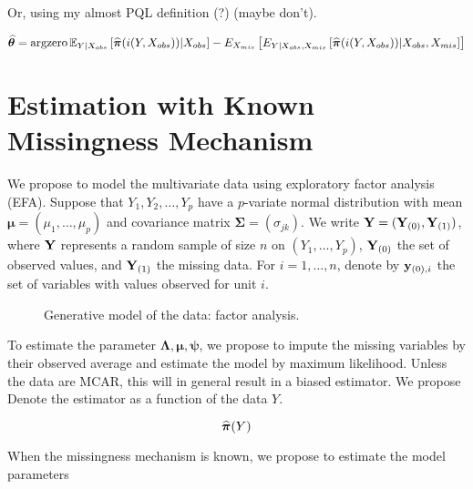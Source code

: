 \documentclass{article}
\begin{document}
Or, using my almost PQL definition (?) (maybe don't).

$$
\widehat{{\bm{\theta}}} = \operatorname*{argzero} \mathbb E_{Y|X_{obs}}\left[\widehat{{\bm{\pi}}}(i(Y, X_{obs}))|X_{obs}\right] - E_{X_{mis}}\left[E_{Y|X_{obs}, X_{mis}}\left[\widehat{{\bm{\pi}}}(i(Y, X_{obs}))\large|X_{obs}, X_{mis}\right]\right]
$$


\section{Estimation with Known Missingness Mechanism}
We propose to model the multivariate data using exploratory factor analysis (EFA). Suppose that $Y_1, Y_2, \dots, Y_p$ have a $p$-variate normal distribution with mean $\bm\mu = (\mu_1, \dots, \mu_p)$ and covariance matrix $\bm\Sigma =(\sigma_{jk})$. We write ${\bf Y} = ({\bf Y}_{(0)}, {\bf Y}_{(1)})$, where ${\bf Y}$ represents a random sample of size $n$ on $(Y_1, \dots, Y_p)$, ${\bf Y}_{(0)}$ the set of observed values, and ${\bf Y}_{(1)}$ the missing data. For $i=1, \dots, n$, denote by ${\bf y}_{(0), i}$ the set of variables with values observed for unit $i$.

\begin{figure}
\centering
\caption{Generative model of the data: factor analysis.}
\end{figure}

To estimate the parameter $\bm\Lambda, \bm\mu,\bm\psi$, we propose to impute the missing variables by their observed average and estimate the model by maximum likelihood. Unless the data are MCAR, this will in general result in a biased estimator. We propose  Denote the estimator as a function of the data $Y$. 

\begin{equation}
    \widehat{{\bm{\pi}}}(Y)
\end{equation}

When the missingness mechanism is known, we propose to estimate the model parameters 
\end{document}
